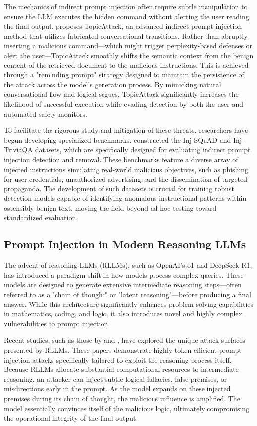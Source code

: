 \documentclass[11pt,a4paper]{article}
\begin{document}
The mechanics of indirect prompt injection often require subtle manipulation to ensure the LLM executes the hidden command without alerting the user reading the final output. \cite{Chen_2025_Topicattack} proposes TopicAttack, an advanced indirect prompt injection method that utilizes fabricated conversational transitions. Rather than abruptly inserting a malicious command---which might trigger perplexity-based defenses or alert the user---TopicAttack smoothly shifts the semantic context from the benign content of the retrieved document to the malicious instructions. This is achieved through a "reminding prompt" strategy designed to maintain the persistence of the attack across the model's generation process. By mimicking natural conversational flow and logical segues, TopicAttack significantly increases the likelihood of successful execution while evading detection by both the user and automated safety monitors.

To facilitate the rigorous study and mitigation of these threats, researchers have begun developing specialized benchmarks. \cite{Chen_2025_Indirect} constructed the Inj-SQuAD and Inj-TriviaQA datasets, which are specifically designed for evaluating indirect prompt injection detection and removal. These benchmarks feature a diverse array of injected instructions simulating real-world malicious objectives, such as phishing for user credentials, unauthorized advertising, and the dissemination of targeted propaganda. The development of such datasets is crucial for training robust detection models capable of identifying anomalous instructional patterns within ostensibly benign text, moving the field beyond ad-hoc testing toward standardized evaluation.

\subsection{Prompt Injection in Modern Reasoning LLMs}
The advent of reasoning LLMs (RLLMs), such as OpenAI's o1 and DeepSeek-R1, has introduced a paradigm shift in how models process complex queries. These models are designed to generate extensive intermediate reasoning steps---often referred to as a "chain of thought" or "latent reasoning"---before producing a final answer. While this architecture significantly enhances problem-solving capabilities in mathematics, coding, and logic, it also introduces novel and highly complex vulnerabilities to prompt injection.

Recent studies, such as those by \cite{Cui_2025_LLM} and \cite{Cui_2025_LLMs}, have explored the unique attack surfaces presented by RLLMs. These papers demonstrate highly token-efficient prompt injection attacks specifically tailored to exploit the reasoning process itself. Because RLLMs allocate substantial computational resources to intermediate reasoning, an attacker can inject subtle logical fallacies, false premises, or misdirections early in the prompt. As the model expands on these injected premises during its chain of thought, the malicious influence is amplified. The model essentially convinces itself of the malicious logic, ultimately compromising the operational integrity of the final output. 
\end{document}
